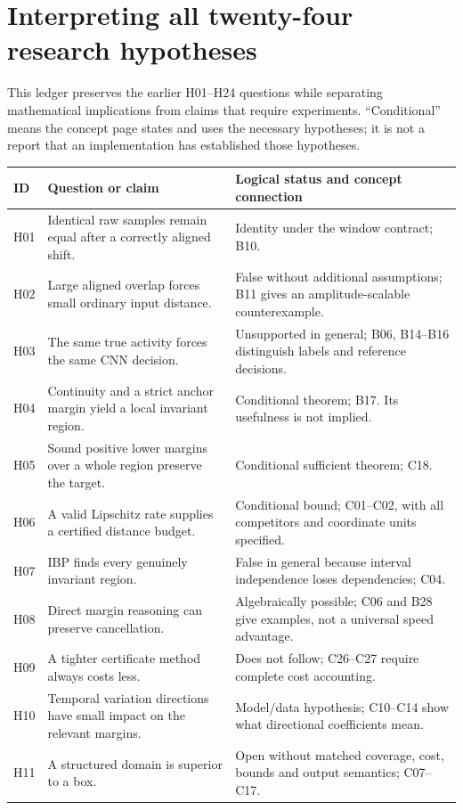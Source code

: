 \section{Interpreting all twenty-four research hypotheses}
This ledger preserves the earlier H01--H24 questions while separating
mathematical implications from claims that require experiments. ``Conditional''
means the concept page states and uses the necessary hypotheses; it is not
a report that an implementation has established those hypotheses.
\small
\begin{longtable}{@{}P{0.9cm}P{7.2cm}P{7.1cm}@{}}\toprule
ID & Question or claim & Logical status and concept connection\\\midrule\endhead
H01 & Identical raw samples remain equal after a correctly aligned shift. & Identity under the window contract; B10.\\
H02 & Large aligned overlap forces small ordinary input distance. & False without additional assumptions; B11 gives an amplitude-scalable counterexample.\\
H03 & The same true activity forces the same CNN decision. & Unsupported in general; B06, B14--B16 distinguish labels and reference decisions.\\
H04 & Continuity and a strict anchor margin yield a local invariant region. & Conditional theorem; B17. Its usefulness is not implied.\\
H05 & Sound positive lower margins over a whole region preserve the target. & Conditional sufficient theorem; C18.\\
H06 & A valid Lipschitz rate supplies a certified distance budget. & Conditional bound; C01--C02, with all competitors and coordinate units specified.\\
H07 & IBP finds every genuinely invariant region. & False in general because interval independence loses dependencies; C04.\\
H08 & Direct margin reasoning can preserve cancellation. & Algebraically possible; C06 and B28 give examples, not a universal speed advantage.\\
H09 & A tighter certificate method always costs less. & Does not follow; C26--C27 require complete cost accounting.\\
H10 & Temporal variation directions have small impact on the relevant margins. & Model/data hypothesis; C10--C14 show what directional coefficients mean.\\
H11 & A structured domain is superior to a box. & Open without matched coverage, cost, bounds and output semantics; C07--C17.\\

\end{longtable}
